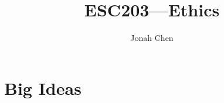 \documentclass[a4paper]{article}
\title{ESC203---Ethics}
\author{Jonah Chen}
\numberwithin{equation}{section}
\begin{document}
\maketitle
\tableofcontents

\section{Big Ideas}
\end{document}
